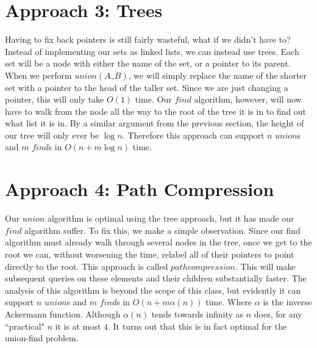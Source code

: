 \section{Approach 3: Trees}
Having to fix back pointers is still fairly wasteful, what if we didn't have
to? Instead of implementing our sets as linked lists, we can instead
use trees. Each set will be a node with either the name of the set, or a
pointer to its parent. When we perform $union(A,B)$, we will simply
replace the name of the shorter set with a pointer to the head of the taller
set. Since we are just changing a pointer, this will only take $O(1)$ time.
Our $find$ algorithm, however, will now have to walk from the node all the way
to the root of the tree it is in to find out what list it is in. By a
similar argument from the previous section, the height of our tree will only
ever be $\log n$. 
Therefore this approach can support $n$ $union$s and $m$ $find$s
in $O(n + m \log n)$ time.

\section{Approach 4: Path Compression}
Our $union$ algorithm is optimal using the tree approach, but it has
made our $find$ algorithm suffer. To fix this, we make a simple observation.
Since our find algorithm must already walk through several nodes in the tree,
once we get to the root we can, without worsening the time,
relabel all of their pointers to point directly to the root. This approach
is called $path compression$. This will make
subsequent queries on these elements and their children substantially faster.
The analysis of this algorithm is beyond the scope of this class, but
evidently it  can support $n$ $union$s and $m$ $find$s
in $O(n + m \alpha(n))$ time. Where $\alpha$ is the inverse Ackermann function. 
Although $\alpha(n)$ tends towards infinity as $n$ does, for any ``practical"
$n$ it is at most $4$. It turns out that this is in fact optimal for the
union-find problem.
